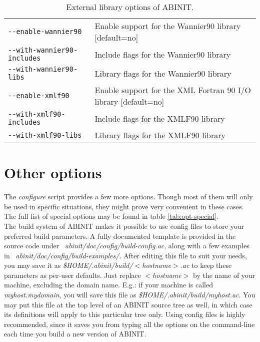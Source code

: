 \begin{table}
\begin{center}
\begin{tabular}{|l|p{9cm}|}
\hline
\texttt{-{-}enable-wannier90} & Enable support for the Wannier90 library
                  [default=no] \\
\texttt{-{-}with-wannier90-includes} & Include flags for the Wannier90 library \\
\texttt{-{-}with-wannier90-libs} & Library flags for the Wannier90 library \\
\hline
\texttt{-{-}enable-xmlf90} & Enable support for the XML Fortran 90 I/O library
                  [default=no] \\
\texttt{-{-}with-xmlf90-includes} & Include flags for the XMLF90 library \\
\texttt{-{-}with-xmlf90-libs} & Library flags for the XMLF90 library \\
\hline
\end{tabular}
\end{center}
\caption{External library options of ABINIT.}
\label{tab:opt-extlibs}
\end{table}

\section{Other options}

The \textit{configure} script provides a few more options. Though most
of them will only be used in specific situations, they might prove very
convenient in these cases. The full list of special options may be found
in table \ref{tab:opt-special}.
\\

The build system of ABINIT makes it possible to use config files to
store your preferred build parameters. A fully documented template is
provided in the source code under
\textit{~abinit/doc/config/build-config.ac}, along with a few examples
in \textit{~abinit/doc/config/build-examples/}. After editing this file
to suit your needs, you may save it as
\textit{\$HOME/.abinit/build/$<$hostname$>$.ac} to keep these parameters
as per-user defaults. Just replace \textit{$<$hostname$>$} by the name
of your machine, excluding the domain name. E.g.: if your machine is
called \textit{myhost.mydomain}, you will save this file as
\textit{\$HOME/.abinit/build/myhost.ac}. You may put this file at the
top level of an ABINIT source tree as well, in which case its
definitions will apply to this particular tree only. Using config files
is highly recommended, since it saves you from typing all the options on
the command-line each time you build a new version of ABINIT.
\\

